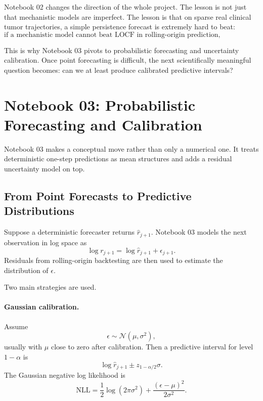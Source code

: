 \documentclass[11pt,a4paper]{article}
\newcommand{\Normal}{\mathcal{N}}
\begin{document}
Notebook 02 changes the direction of the whole project. The lesson is not just that mechanistic models are imperfect. The lesson is that on sparse real clinical tumor trajectories, a simple persistence forecast is extremely hard to beat:
\[
\boxed{
\text{if a mechanistic model cannot beat LOCF in rolling-origin prediction, retrospective fit alone is not enough evidence}
}
\]

This is why Notebook 03 pivots to probabilistic forecasting and uncertainty calibration. Once point forecasting is difficult, the next scientifically meaningful question becomes: can we at least produce calibrated predictive intervals?

\section{Notebook 03: Probabilistic Forecasting and Calibration}

Notebook 03 makes a conceptual move rather than only a numerical one. It treats deterministic one-step predictions as mean structures and adds a residual uncertainty model on top.

\subsection{From Point Forecasts to Predictive Distributions}

Suppose a deterministic forecaster returns $\widehat r_{j+1}$. Notebook 03 models the next observation in log space as
\[
    \log r_{j+1}
    =
    \log \widehat r_{j+1}
    +
    \epsilon_{j+1}.
\]
Residuals from rolling-origin backtesting are then used to estimate the distribution of $\epsilon$.

Two main strategies are used.

\paragraph{Gaussian calibration.}
Assume
\[
    \epsilon\sim\Normal(\mu,\sigma^2),
\]
usually with $\mu$ close to zero after calibration. Then a predictive interval for level $1-\alpha$ is
\[
    \log \widehat r_{j+1}\pm z_{1-\alpha/2}\sigma.
\]
The Gaussian negative log likelihood is
\[
    \mathrm{NLL}
    =
    \frac{1}{2}\log(2\pi\sigma^2)
    +
    \frac{(\epsilon-\mu)^2}{2\sigma^2}.
\]
\end{document}
